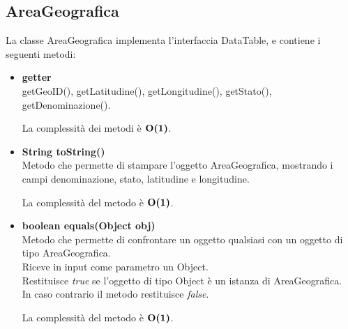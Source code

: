 \documentclass[a4paper, 12pt]{scrreprt}
\begin{document}
			\subsection{AreaGeografica}
			La classe AreaGeografica implementa l'interfaccia DataTable, e contiene i seguenti metodi:
				\begin{itemize}
				\item \textbf{getter}
				\\getGeoID(), getLatitudine(), getLongitudine(), getStato(), getDenominazione().
				
				La complessit\`a dei metodi \`e $\mathbf{O}\textbf{(1)}$.
				
				\item \textbf{String toString()}
				\\Metodo che permette di stampare l'oggetto AreaGeografica, mostrando i campi denominazione, stato, latitudine e longitudine.
				
				La complessit\`a del metodo \`e $\mathbf{O}\textbf{(1)}$.
				
				\item \textbf{boolean equals(Object obj)}
				\\Metodo che permette di confrontare un oggetto qualsiasi con un oggetto di tipo AreaGeografica.
				\\Riceve in input come parametro un Object.
				\\Restituisce \textit{true} se l'oggetto di tipo Object \`e un istanza di AreaGeografica.
				\\In caso contrario il metodo restituisce \textit{false}.
				
				La complessit\`a del metodo \`e $\mathbf{O}\textbf{(1)}$.
				
			\end{itemize}
\end{document}
